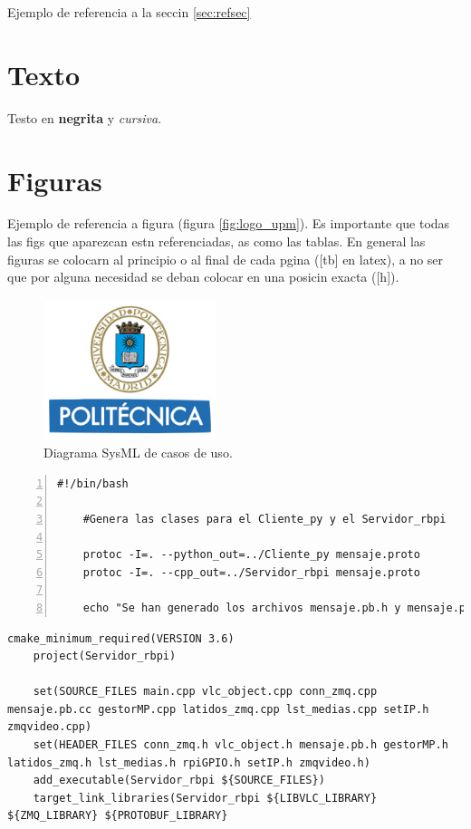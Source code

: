 Ejemplo de referencia a la seccin \ref{sec:refsec}

\section{Texto}

Testo en \textbf{negrita} y \textit{cursiva}.

\section{Figuras}

Ejemplo de referencia a figura (figura \ref{fig:logo_upm}). Es importante que todas las figs que aparezcan estn referenciadas, as como las tablas. En general las figuras se colocarn al principio o al final de cada pgina ([tb] en latex), a no ser que por alguna necesidad se deban colocar en una posicin exacta ([h]).

\begin{figure}[H]
\centering
\includegraphics[width=0.45\textwidth]{figs/Logo_UPM.jpg}
\caption[Diagrama SysML de casos de uso]{Diagrama SysML de casos de uso.}
\label{fig:use_cases}
\end{figure}

\begin{lstlisting}[style=consola, numbers=left]
    #!/bin/bash

    #Genera las clases para el Cliente_py y el Servidor_rbpi

    protoc -I=. --python_out=../Cliente_py mensaje.proto
    protoc -I=. --cpp_out=../Servidor_rbpi mensaje.proto

    echo "Se han generado los archivos mensaje.pb.h y mensaje.pb.cc"
\end{lstlisting}

\begin{lstlisting}[style=C, numbers=none]
    cmake_minimum_required(VERSION 3.6)
    project(Servidor_rbpi)

    set(SOURCE_FILES main.cpp vlc_object.cpp conn_zmq.cpp mensaje.pb.cc gestorMP.cpp latidos_zmq.cpp lst_medias.cpp setIP.h zmqvideo.cpp)
    set(HEADER_FILES conn_zmq.h vlc_object.h mensaje.pb.h gestorMP.h latidos_zmq.h lst_medias.h rpiGPIO.h setIP.h zmqvideo.h)
    add_executable(Servidor_rbpi ${SOURCE_FILES})
    target_link_libraries(Servidor_rbpi ${LIBVLC_LIBRARY} ${ZMQ_LIBRARY} ${PROTOBUF_LIBRARY}
\end{lstlisting}